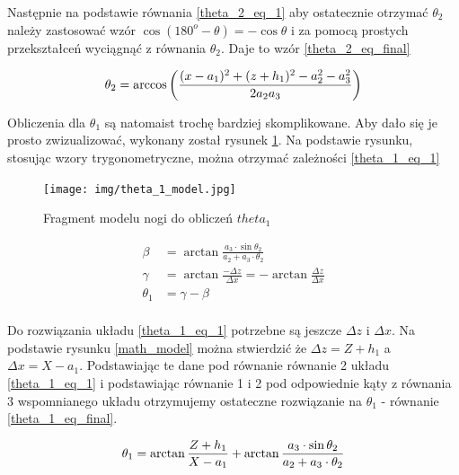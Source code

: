 Następnie na podstawie równania \ref{theta_2_eq_1} aby ostatecznie otrzymać $\theta_2$ należy zastosować wzór $\cos{(180^o - \theta)} = -\cos{\theta}$ i za pomocą prostych przekształceń wyciągnąć z równania $\theta_2$. Daje to wzór \ref{theta_2_eq_final} \cite{SCARA_model_calc}

\begin{equation} \label{theta_2_eq_final}
\theta_2 = \arccos{\left( \frac{(x - a_1)^2 + (z + h_1)^2 - a_2^2 - a_3^2}{2 a_2 a_3} \right)}\\ 
\end{equation} 

Obliczenia dla $\theta_1$ są natomaist trochę bardziej skomplikowane. Aby dało się je prosto zwizualizować, wykonany został rysunek \ref{theta_1_model}. Na podstawie rysunku, stosując wzory trygonometryczne, można otrzymać zależności \ref{theta_1_eq_1} \cite{SCARA_model_calc}

\begin{figure}[h!]
\texttt{[image: img/theta\_1\_model.jpg]}
\caption{Fragment modelu nogi do obliczeń $theta_1$}
\label{theta_1_model}
\end{figure}

\begin{equation}\label{theta_1_eq_1}
\begin{split}
\beta &= \arctan{\frac{a_3 \cdot \sin{\theta_2}}{a_2 + a_3 \cdot{\theta_2}}}\\
\gamma &= \arctan{\frac{-\Delta z}{\Delta x}} = - \arctan{\frac{\Delta z}{\Delta x}}\\
\theta_1 &= \gamma - \beta\\
\end{split}
\end{equation}

Do rozwiązania układu \ref{theta_1_eq_1} potrzebne są jeszcze $\Delta z$ i $\Delta x$. Na podstawie rysunku \ref{math_model} można stwierdzić że $\Delta z = Z + h_1$ a $\Delta x = X - a_1$. Podstawiając te dane pod równanie równanie 2 układu \ref{theta_1_eq_1} i podstawiając równanie 1 i 2 pod odpowiednie kąty z równania 3 wspomnianego układu otrzymujemy ostateczne rozwiązanie na $\theta_1$ - równanie \ref{theta_1_eq_final}.



\begin{equation}\label{theta_1_eq_final}
\theta_1 = \arctan{\frac{Z + h_1}{X - a_1}} + \arctan{\frac{a_3 \cdot \sin{\theta_2}}{a_2 + a_3 \cdot{\theta_2}}}\\ 
\end{equation}

